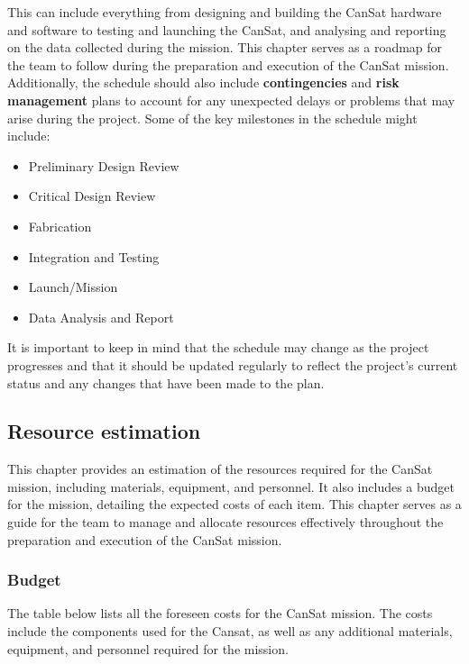 \documentclass[11pt]{article}
\begin{document}
This can include everything from designing and building the CanSat hardware and software to testing and launching the CanSat, and analysing and reporting on the data collected during the mission.
This chapter serves as a roadmap for the team to follow during the preparation and execution of the CanSat mission.
Additionally, the schedule should also include {\bf contingencies} and {\bf risk management} plans to account for any unexpected delays or problems that may arise during the project.
Some of the key milestones in the schedule might include:
\begin{itemize}
    \item Preliminary Design Review
    \item Critical Design Review
    \item Fabrication
    \item Integration and Testing
    \item Launch/Mission
    \item Data Analysis and Report
\end{itemize}

It is important to keep in mind that the schedule may change as the project progresses and that it should be updated regularly to reflect the project's current status and any changes that have been made to the plan.


\subsection{Resource estimation}
This chapter provides an estimation of the resources required for the CanSat mission, including materials, equipment, and personnel. It also includes a budget for the mission, detailing the expected costs of each item. This chapter serves as a guide for the team to manage and allocate resources effectively throughout the preparation and execution of the CanSat mission.

\subsubsection{Budget}
The table below lists all the foreseen costs for the CanSat mission. The costs include the components used for the Cansat, as well as any additional materials, equipment, and personnel required for the mission.
\end{document}
